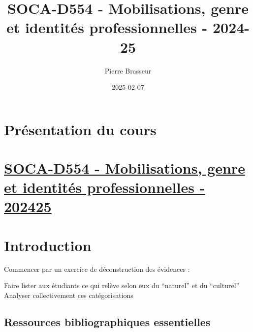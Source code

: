 \documentclass[
  letterpaper,
  DIV=11,
  numbers=noendperiod]{scrreprt}
\title{SOCA-D554 - Mobilisations, genre et identités professionnelles -
2024- 25}
\author{Pierre Brasseur}
\date{2025-02-07}
\renewcommand*\contentsname{Table of contents}
\newcommand\contentsname{Table of contents}
\begin{document}
\maketitle

\renewcommand*\contentsname{Table of contents}
{
\hypersetup{linkcolor=}
\setcounter{tocdepth}{2}
\tableofcontents
}


\chapter*{Présentation du cours}\label{pruxe9sentation-du-cours}



\chapter*{\texorpdfstring{\href{https://uv.ulb.ac.be/course/view.php?id=122389}{SOCA-D554
- Mobilisations, genre et identités professionnelles -
202425}}{SOCA-D554 - Mobilisations, genre et identités professionnelles - 202425}}\label{soca-d554---mobilisations-genre-et-identituxe9s-professionnelles---202425}



\chapter{Introduction}\label{introduction}

Commencer par un exercice de déconstruction des évidences :

Faire lister aux étudiants ce qui relève selon eux du ``naturel'' et du
``culturel'' Analyser collectivement ces catégorisations

\section{Ressources bibliographiques
essentielles}\label{ressources-bibliographiques-essentielles}
\end{document}
